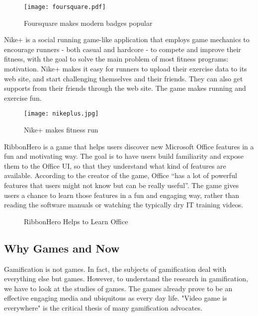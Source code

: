 \begin{figure}[htbp]
	\centering
		\texttt{[image: foursquare.pdf]}
		\caption{Foursquare makes modern badges popular}
		\label{fig:foursquare}
\end{figure}

Nike+ \cite{nikeplus} is a social running game-like application that employs game mechanics to encourage runners - both casual and hardcore - to compete and improve their fitness, with the goal to solve the main problem of most fitness programs: motivation. Nike+ makes it easy for runners to upload their exercise data to its web site, and start challenging themselves and their friends. They can also get supports from their friends through the web site. The game makes running and exercise fun.

\begin{figure}[htbp]
	\centering
		\texttt{[image: nikeplus.jpg]}
		\caption{Nike+ makes fitness run}
		\label{fig:nikeplus}
\end{figure}

RibbonHero \cite{ribbonhero} is a game that helps users discover new Microsoft Office features in a fun and motivating way. The goal is to have users build familiarity and expose them to the Office UI, so that they understand what kind of features are available. According to the creator of the game, Office ``has a lot of powerful features that users might not know but can be really useful''. The game gives users a chance to learn those features in a fun and engaging way, rather than reading the software manuals or watching the typically dry IT training videos.

\begin{figure}[htbp]
	\centering
		\caption{RibbonHero Helps to Learn Office}
		\label{fig:ribbon}
\end{figure}

\subsection{Why Games and Now}

Gamification is not games. In fact, the subjects of gamification deal with everything else but games. However, to understand the research in gamification, we have to look at the studies of games. The games already prove to be an effective engaging media and ubiquitous as every day life. "Video game is everywhere" is the critical thesis of many gamification advocates. 

